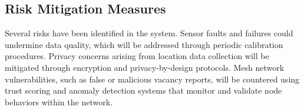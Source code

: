\subsection{Risk Mitigation Measures}

Several risks have been identified in the system. Sensor faults and failures could undermine data quality, which will be addressed through periodic calibration procedures. Privacy concerns arising from location data collection will be mitigated through encryption and privacy-by-design protocols. Mesh network vulnerabilities, such as false or malicious vacancy reports, will be countered using trust scoring and anomaly detection systems that monitor and validate node behaviors within the network.